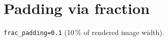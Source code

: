 \documentclass{article}
\begin{document}
\section*{Padding via fraction}

\texttt{frac\_padding=0.1} (10\,\% of rendered image width).

\lipsum[1-8]
\end{document}
